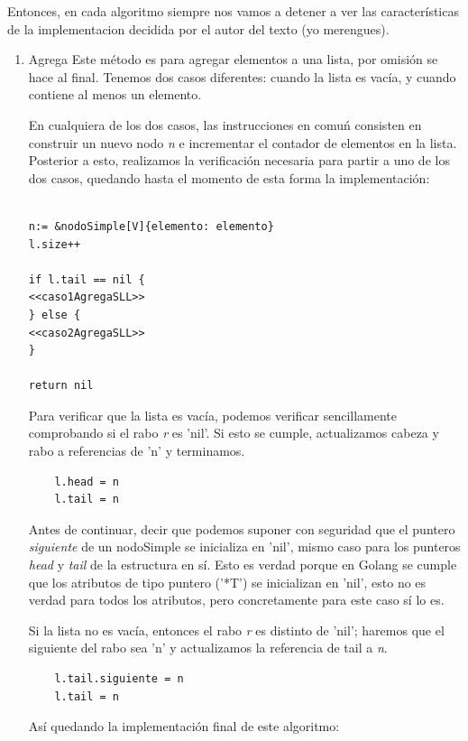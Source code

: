 \documentclass[11pt]{article}
\begin{document}
Entonces, en cada algoritmo siempre nos vamos a detener a ver las características de la implementacion decidida por el autor del texto (yo merengues).
\begin{enumerate}
\item Agrega
\label{sec:org4da64cc}
Este método es para agregar elementos a una lista, por omisión se hace al final. Tenemos dos casos diferentes: cuando la lista es vacía, y cuando contiene al menos un elemento.

En cualquiera de los dos casos, las instrucciones en comuń consisten en construir un nuevo nodo \emph{n} e incrementar el contador de elementos en la lista. Posterior a esto, realizamos la verificación necesaria para partir a uno de los dos casos, quedando hasta el momento de esta forma la implementación:

\begin{verbatim}

n:= &nodoSimple[V]{elemento: elemento}
l.size++

if l.tail == nil {
<<caso1AgregaSLL>>
} else {
<<caso2AgregaSLL>>
}

return nil

\end{verbatim}

Para verificar que la lista es vacía, podemos verificar sencillamente comprobando si el rabo \emph{r} es 'nil'. Si esto se cumple, actualizamos cabeza y rabo a referencias de 'n' y terminamos.

\begin{verbatim}
	l.head = n
	l.tail = n
\end{verbatim}

Antes de continuar, decir que podemos suponer con seguridad que el puntero \emph{siguiente} de un nodoSimple se inicializa en 'nil', mismo caso para los punteros \emph{head} y \emph{tail} de la estructura en sí. Esto es verdad porque en Golang se cumple que los atributos de tipo puntero ('*T') se inicializan en 'nil', esto no es verdad para todos los atributos, pero concretamente para este caso sí lo es.

Si la lista no es vacía, entonces el rabo \emph{r} es distinto de 'nil'; haremos que el siguiente del rabo sea 'n' y actualizamos la referencia de tail a \emph{n}.

\begin{verbatim}
	l.tail.siguiente = n
	l.tail = n
\end{verbatim}

Así quedando la implementación final de este algoritmo:


\end{enumerate}
\end{document}
